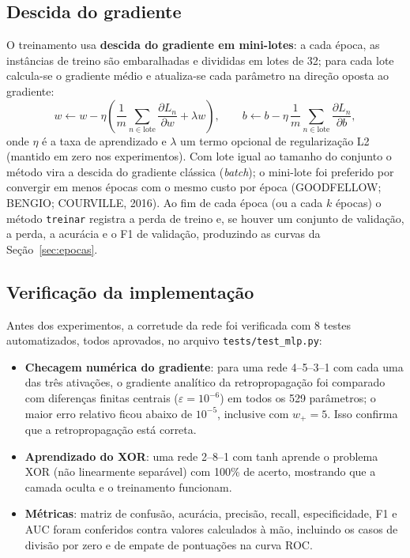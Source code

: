 \documentclass[11pt,a4paper]{article}
\begin{document}
\subsection{Descida do gradiente}
O treinamento usa \textbf{descida do gradiente em mini-lotes}: a cada época, as instâncias de treino são
embaralhadas e divididas em lotes de 32; para cada lote calcula-se o gradiente médio e atualiza-se cada
parâmetro na direção oposta ao gradiente:
\[
  w \leftarrow w - \eta\left(\frac{1}{m}\sum_{n \in \text{lote}} \frac{\partial L_n}{\partial w} + \lambda w\right),
  \qquad b \leftarrow b - \eta\,\frac{1}{m}\sum_{n \in \text{lote}} \frac{\partial L_n}{\partial b},
\]
onde $\eta$ é a taxa de aprendizado e $\lambda$ um termo opcional de regularização L2 (mantido em zero nos
experimentos). Com lote igual ao tamanho do conjunto o método vira a descida do gradiente clássica
(\emph{batch}); o mini-lote foi preferido por convergir em menos épocas com o mesmo custo por época
(GOODFELLOW; BENGIO; COURVILLE, 2016).
Ao fim de cada época (ou a cada $k$ épocas) o método \texttt{treinar} registra a perda de treino e, se
houver um conjunto de validação, a perda, a acurácia e o F1 de validação, produzindo as curvas da
Seção~\ref{sec:epocas}.

\subsection{Verificação da implementação}
Antes dos experimentos, a corretude da rede foi verificada com 8 testes automatizados, todos aprovados,
no arquivo \texttt{tests/test\_mlp.py}:
\begin{itemize}
  \item \textbf{Checagem numérica do gradiente}: para uma rede 4--5--3--1 com cada uma das três ativações, o
        gradiente analítico da retropropagação foi comparado com diferenças finitas centrais
        ($\varepsilon = 10^{-6}$) em todos os 529 parâmetros; o maior erro relativo ficou abaixo de $10^{-5}$,
        inclusive com $w_+ = 5$. Isso confirma que a retropropagação está correta.
  \item \textbf{Aprendizado do XOR}: uma rede 2--8--1 com tanh aprende o problema XOR (não linearmente
        separável) com 100\% de acerto, mostrando que a camada oculta e o treinamento funcionam.
  \item \textbf{Métricas}: matriz de confusão, acurácia, precisão, recall, especificidade, F1 e AUC foram
        conferidos contra valores calculados à mão, incluindo os casos de divisão por zero e de empate de
        pontuações na curva ROC.
\end{itemize}
\end{document}
